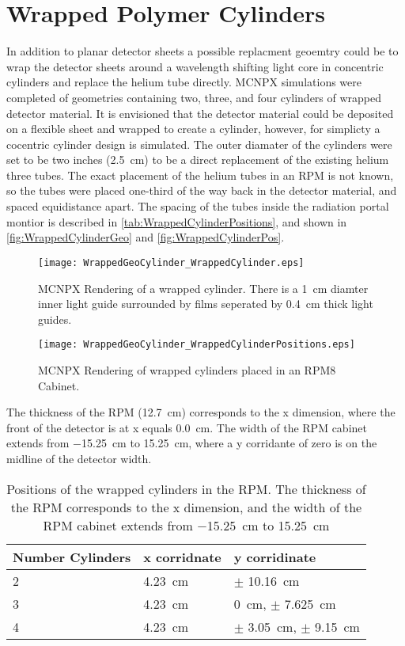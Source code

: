 \section{Wrapped Polymer Cylinders}
\label{sec:WrappedCylinders}

In addition to planar detector sheets a possible replacment geoemtry could be to wrap the detector sheets around a wavelength shifting light core in concentric cylinders and replace the helium tube directly.
MCNPX simulations were completed of geometries containing two, three, and four cylinders of wrapped detector material.
It is envisioned that the detector material could be deposited on a flexible sheet and wrapped to create a cylinder, however, for simplicty a cocentric cylinder design is simulated.
The outer diamater of the cylinders were set to be two inches (\SI{2.5}{\cm}) to be a direct replacement of the existing helium three tubes.
The exact placement of the helium tubes in an RPM is not known, so the tubes were placed one-third of the way back in the detector material, and spaced equidistance apart.
The spacing of the tubes inside the radiation portal montior is described in \autoref{tab:WrappedCylinderPositions}, and shown in \autoref{fig:WrappedCylinderGeo} and \autoref{fig:WrappedCylinderPos}.
\begin{figure}
  \centering
  \texttt{[image: WrappedGeoCylinder\_WrappedCylinder.eps]}
  \caption[Rendering of Wrapped Cylinder Geometry]{MCNPX Rendering of a wrapped cylinder.  There is a \SI{1}{\cm} diamter inner light guide surrounded by films seperated by \SI{0.4}{\cm} thick light guides.}
  \label{fig:WrappedCylinderGeo}
\end{figure}
\begin{figure}
  \centering
  \texttt{[image: WrappedGeoCylinder\_WrappedCylinderPositions.eps]}
  \caption[Positions of Wrapped Cylinders in RPM Cabinet]{MCNPX Rendering of wrapped cylinders placed in an RPM8 Cabinet.}
  \label{fig:WrappedCylinderPos}
\end{figure}
The thickness of the RPM (\SI{12.7}{\cm}) corresponds to the x dimension, where the front of the detector is at x equals \SI{0.0}{\cm}.
The width of the RPM cabinet extends from \SI{-15.25}{\cm} to \SI{15.25}{\cm}, where a y corridante of zero is on the midline of the detector width.
\begin{table}
  \caption[Wrapped Cylinder Positions]{Positions of the wrapped cylinders in the RPM. The thickness of the RPM corresponds to the x dimension, and the width of the RPM cabinet extends from \SI{-15.25}{\cm} to \SI{15.25}{\cm}}
  \label{tab:WrappedCylinderPositions}
  \begin{tabular}{m{2cm} | m{3cm} m{4cm} }
    \toprule
    Number Cylinders & x corridnate & y corridinate \\
    \midrule
    2 & \SI{4.23}{\cm} & $\pm$ \SI{10.16}{\cm} \\
    3 & \SI{4.23}{\cm} & \SI{0}{\cm}, $\pm$ \SI{7.625}{\cm} \\
    4 & \SI{4.23}{\cm} & $\pm$ \SI{3.05}{\cm}, $\pm$ \SI{9.15}{\cm} \\
    \bottomrule
  \end{tabular}
\end{table}

